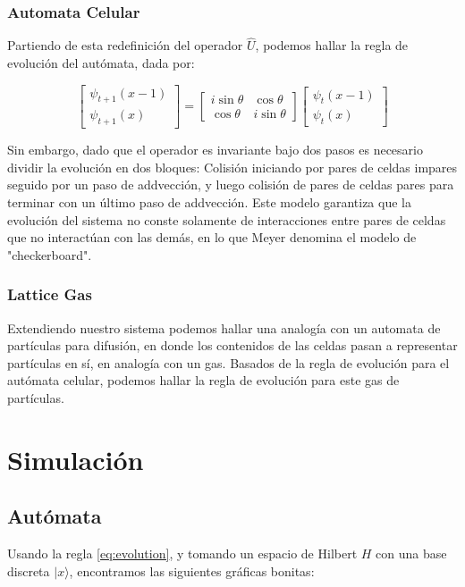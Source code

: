 \documentclass[12pts, letterpaper, twocolumn]{article}
\begin{document}
\subsubsection{Automata Celular}
Partiendo de esta redefinición del operador $\hat{U}$, podemos hallar la regla de 
evolución del autómata, dada por:

 \begin{equation}\label{eq:evolution}
    \left[ 
    \begin{matrix}
        \psi_{t+1}(x-1) \\
        \psi_{t+1}(x)
    \end{matrix}
    \right] = 
    \begin{bmatrix}
        i\sin\theta & \cos\theta \\
        \cos\theta & i\sin\theta
    \end{bmatrix}
    \left[ 
    \begin{matrix}
        \psi_{t}(x-1) \\
        \psi_{t}(x)
    \end{matrix}
    \right]
\end{equation}

Sin embargo, dado que el operador es invariante bajo dos pasos es necesario dividir la 
evolución en dos bloques: Colisión iniciando por pares de celdas impares seguido por un 
paso de addvección, y luego colisión de pares de celdas pares para terminar con un último 
paso de addvección. Este modelo garantiza que la evolución del sistema no conste solamente 
de interacciones entre pares de celdas que no interactúan con las demás, en lo que Meyer 
denomina el modelo de "checkerboard".

\subsubsection{Lattice Gas}
Extendiendo nuestro sistema podemos hallar una analogía con un automata de partículas para
difusión, en donde los contenidos de las celdas pasan a representar partículas en sí, 
en analogía con un gas. Basados de la regla de evolución para el autómata celular, podemos 
hallar la regla de evolución para este gas de partículas.

\section{Simulación}
\subsection{Autómata}
Usando la regla \ref{eq:evolution}, y tomando un espacio de Hilbert $H$ con una base 
discreta $|x\rangle$, encontramos las siguientes gráficas bonitas: 
\end{document}
